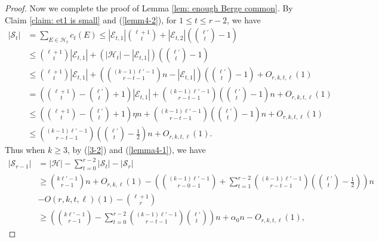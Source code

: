 \documentclass[10pt,a4paper]{amsart}
\def\q{\hfill\rule{1ex}{1ex}}
\newcommand{\ber}{\text{Berge-}}
\newcommand{\mh}{\mathcal{H}}
\begin{document}
\begin{proof}
Now we complete the proof of Lemma \ref{lem: enough Berge common}.
     By Claim \ref{claim: et1 is small} and (\ref{lemm4-2}), for $1\le t\le r-2$, we have
     \begin{equation}\label{lemma4-1}
     \begin{aligned}
     |\mathcal{S}_{t}|&=\sum_{E\in \mh_t}c_t(E)\leq |\mathcal{E}_{t,1}|\binom{\ell+1}{t}+|\mathcal{E}_{t,2}|\left(\binom{\ell'}{t}-1\right)\\
     & \leq \binom{\ell+1}{t}|\mathcal{E}_{t,1}|+(|\mh_t|-|\mathcal{E}_{t,1}|)\left(\binom{\ell'}{t}-1\right)\\
     &\leq  \binom{\ell+1}{t}|\mathcal{E}_{t,1}|+\left(\binom{(k-1)\ell'-1}{r-t-1}n-|\mathcal{E}_{t,1}|\right)\left(\binom{\ell'}{t}-1\right)+O_{r,k,t,\ell}(1)\\
     &=\left(\binom{\ell+1}{t}-\binom{\ell'}{t}+1\right)|\mathcal{E}_{t,1}|+\binom{(k-1)\ell'-1}{r-t-1}\left(\binom{\ell'}{t}-1\right) n+O_{r,k,t,\ell}(1)\\
     &\leq \left(\binom{\ell+1}{t}-\binom{\ell'}{t}+1\right)\eta n+\binom{(k-1)\ell'-1}{r-t-1}\left(\binom{\ell'}{t}-1\right) n+O_{r,k,t,\ell}(1)\\
     &\leq \binom{(k-1)\ell'-1}{r-t-1}\left(\binom{\ell'}{t}-\frac{1}{2}\right) n+O_{r,k,t,\ell}(1).
     \end{aligned}
     \end{equation}
     Thus when $k\geq 3$, by (\ref{3-2}) and (\ref{lemma4-1}), we have
     \begin{equation}\label{4-41}
         \begin{aligned}
             |\mathcal{S}_{r-1}|&=|\mh|-\sum_{t=0}^{r-2}|\mathcal{S}_t|-|\mathcal{S}_r|\\
             &\geq \binom{k\ell'-1}{r-1}n+O_{r,k,\ell}(1)-\left(\binom{(k-1)\ell'-1}{r-0-1}+\sum_{t=1}^{r-2}\binom{(k-1)\ell'-1}{r-t-1}\left(\binom{\ell'}{t}-\frac{1}{2}\right)\right)n\\
            & -O(r,k,t,\ell)(1)-\binom{\ell+1}{r}\\
            &\geq\left(\binom{k\ell'-1}{r-1}-\sum_{t=0}^{r-2}\binom{(k-1)\ell'-1}{r-t-1}\binom{\ell'}{t}\right)n+\alpha_0 n-O_{r,k,t,\ell}(1),
         \end{aligned}

\end{equation}
\end{proof}
\end{document}
